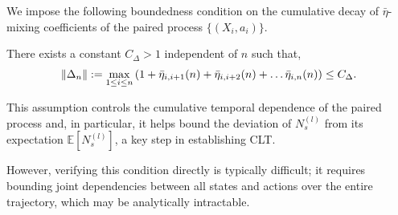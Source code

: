 \documentclass[twoside,11pt]{article}
\newcommand{\pow}[1]{^{(#1)}}%
\numberwithin{equation}{section}
\begin{document}
We impose the following boundedness condition on the cumulative decay of $\bar \eta$-mixing coefficients of the paired process $\{ (X_i, a_i)\}$. 
\begin{assumption}
\label{ass:eta-mix}
    There exists a constant $C_\Delta>1$ independent of $n$ such that, 
\begin{align*}
    \|\Delta_n\|:=\underset{1\leq i\leq n}{\max} \left(1+ \Bar{\eta}_{i,i+1}(n)+ \Bar{\eta}_{i,i+2}(n)+\dots \Bar{\eta}_{i,n}(n)\right)\leq C_\Delta.
\end{align*}
\end{assumption}
This assumption controls the cumulative temporal dependence of the paired process and, in particular, it helps bound the deviation of $N_s \pow l$ from its expectation $\mathbb{E}\left[N_s \pow l\right]$, a key step in establishing CLT.

However, verifying this condition directly is typically difficult; it requires bounding joint dependencies between all states and actions over the entire trajectory, which may be analytically intractable.
\end{document}
